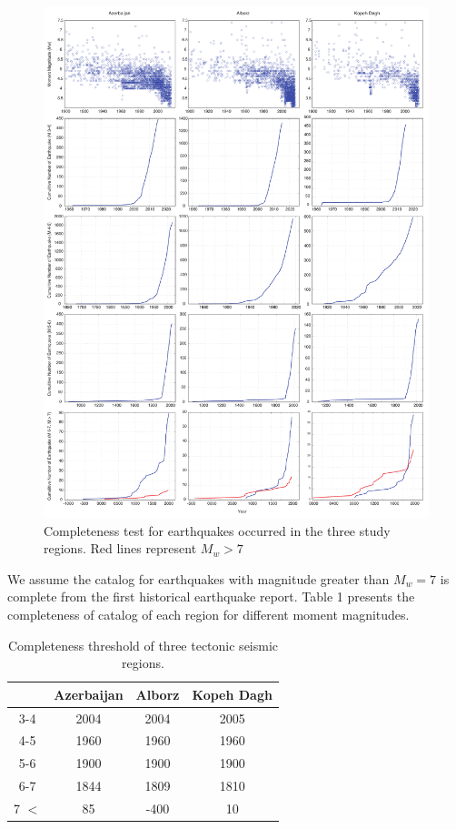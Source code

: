 \documentclass{article}
\begin{document}
\begin{figure} [H]
\centering
\includegraphics[scale=0.3]{figures/pdf/Figure4.pdf} 
\caption{Completeness test for earthquakes occurred in the three study regions. Red lines represent $M_w > 7$ }
\label{fig:comptest}
\end{figure}

We assume the catalog for earthquakes with magnitude greater than $M_w=7$ is complete from the first historical earthquake report. Table 1 presents the completeness of catalog of each region for different moment magnitudes.

\begin{table}[h]
\centering
\caption{Completeness threshold of three tectonic seismic regions.}
\begin{tabular}{cccc}
 ~           & Azerbaijan & Alborz & Kopeh Dagh \\ \hline
3-4         & 2004       & 2004   & 2005       \\ \hline
4-5         & 1960       & 1960   & 1960       \\ \hline
5-6         & 1900       & 1900   & 1900       \\ \hline
6-7         & 1844       & 1809   & 1810         \\ \hline
7 $< $    &  85          & -400    & 10         \\ \hline
\end{tabular}
\end{table}
\end{document}
